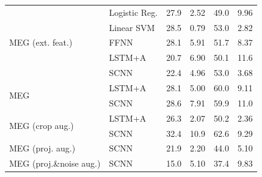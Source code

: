 \documentclass[fleqn,10pt]{wlscirep}
\begin{document}
\begin{table}[htp]
{\begin{tabular}{l l| c | c | c | c}
    \midrule
    \multirow{5}{*}{MEG (ext. feat.)}
                     & Logistic Reg.        & 27.9 & 2.52  & 49.0 & 9.96 \\
                     & Linear SVM          & 28.5 & 0.79  & 53.0 & 2.82 \\
                     & FFNN                & 28.1 & 5.91  & 51.7 & 8.37 \\
                     & LSTM+A              & 20.7 & 6.90  & 50.1 & 11.6 \\
                     & SCNN                & 22.4 & 4.96  & 53.0 & 3.68 \\
    \midrule
    \multirow{2}{*}{MEG}
                         & LSTM+A              & 28.1 & 5.00 & 60.0 & 9.11 \\ 
                         & SCNN                & 28.6 & 7.91 & 59.9 & 11.0 \\
    \midrule
    \multirow{2}{*}{MEG (crop aug.)}
                         & LSTM+A              & 26.3 & 2.07 & 50.2 & 2.36 \\ 
                         & SCNN                & 32.4 & 10.9 & 62.6 & 9.29 \\
    \midrule
    \multirow{1}{*}{MEG (proj. aug.)}
                         & SCNN                & 21.9 & 2.20 & 44.0 & 5.10 \\
    \midrule
    \multirow{1}{*}{MEG (proj.\&noise aug.)}
                         & SCNN                & 15.0 & 5.10 & 37.4 & 9.83 \\
    \bottomrule
  \end{tabular}}
  \label{tab:seven_way_results}
\end{table}
\end{document}
